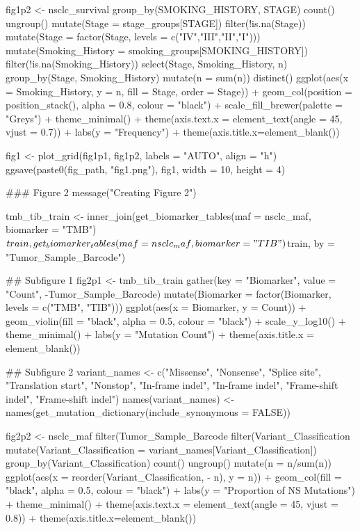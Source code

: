 fig1p2 <- nsclc_survival %
  group_by(SMOKING_HISTORY, STAGE) %
  count() %
  ungroup() %
  mutate(Stage = stage_groups[STAGE]) %
  filter(!is.na(Stage)) %
  mutate(Stage = factor(Stage, levels = c("IV","III","II","I"))) %
  mutate(Smoking_History = smoking_groups[SMOKING_HISTORY])  %
  filter(!is.na(Smoking_History)) %
  select(Stage, Smoking_History, n) %
  group_by(Stage, Smoking_History) %
  mutate(n = sum(n)) %
  distinct() %
  ggplot(aes(x = Smoking_History, y = n, fill = Stage, order = Stage)) +
  geom_col(position = position_stack(), alpha = 0.8, colour = "black") + scale_fill_brewer(palette = "Greys") +
  theme_minimal() + theme(axis.text.x = element_text(angle = 45, vjust = 0.7)) +
  labs(y = "Frequency") + theme(axis.title.x=element_blank())


fig1 <- plot_grid(fig1p1, fig1p2, labels = "AUTO", align = "h")
ggsave(paste0(fig_path, "fig1.png"), fig1, width = 10, height = 4)



### Figure 2
message("Creating Figure 2")



tmb_tib_train <- inner_join(get_biomarker_tables(maf = nsclc_maf, biomarker = "TMB")$train, get_biomarker_tables(maf = nsclc_maf, biomarker = "TIB")$train, by = "Tumor_Sample_Barcode")

## Subfigure 1
fig2p1 <- tmb_tib_train %
  gather(key = "Biomarker", value = "Count", -Tumor_Sample_Barcode) %
  mutate(Biomarker = factor(Biomarker, levels = c("TMB", "TIB"))) %
  ggplot(aes(x = Biomarker, y = Count)) +
  geom_violin(fill = "black", alpha = 0.5, colour = "black") +
  scale_y_log10() +
  theme_minimal() +
  labs(y = "Mutation Count") + theme(axis.title.x = element_blank())


## Subfigure 2
variant_names <- c("Missense", "Nonsense", "Splice site", "Translation start",
                   "Nonstop", "In-frame indel", "In-frame indel", "Frame-shift indel",
                   "Frame-shift indel")
names(variant_names) <- names(get_mutation_dictionary(include_synonymous = FALSE))

fig2p2 <- nsclc_maf %
  filter(Tumor_Sample_Barcode %
  filter(Variant_Classification %
  mutate(Variant_Classification = variant_names[Variant_Classification]) %
  group_by(Variant_Classification) %
  count() %
  ungroup() %
  mutate(n = n/sum(n)) %
  ggplot(aes(x = reorder(Variant_Classification, - n), y = n)) +
  geom_col(fill = "black", alpha = 0.5, colour = "black") + labs(y = "Proportion of NS Mutations") +
  theme_minimal() + theme(axis.text.x = element_text(angle = 45, vjust = 0.8)) +
  theme(axis.title.x=element_blank())


